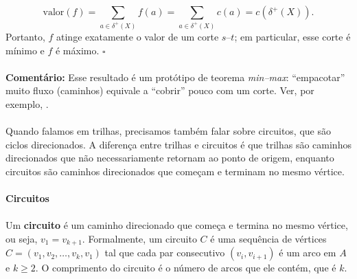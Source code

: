 \documentclass[12pt,a4paper]{article}
\begin{document}
\begin{center}
{{    \[\text{valor}(f)=\sum_{a\in\delta^+(X)} f(a)=\sum_{a\in\delta^+(X)} c(a)=c(\delta^+(X)).\]
    Portanto, \(f\) atinge exatamente o valor de um corte \(s\text{--}t\); em particular, esse corte é mínimo e \(f\) é máximo. \hfill$\square$

\paragraph{}
\smallskip
\textbf{Comentário:} Esse resultado é um protótipo de teorema \emph{min--max}: “empacotar” muito fluxo (caminhos) equivale a “cobrir” pouco com um corte. Ver, por exemplo, \cite{schrijver2003comb}.
}}
\endgroup
\end{center}

\paragraph{}
Quando falamos em trilhas, precisamos também falar sobre circuitos, que são ciclos direcionados.
A diferença entre trilhas e circuitos é que trilhas são caminhos direcionados que não necessariamente retornam ao ponto de origem, enquanto circuitos são caminhos direcionados que começam e terminam no mesmo vértice.

\paragraph{Circuitos}
\paragraph{}
 Um \textbf{circuito} é um caminho direcionado que começa e termina no mesmo vértice, ou seja, \(v_1 = v_{k+1}\). Formalmente, um circuito \(C\) é uma sequência de vértices \(C = (v_1, v_2, \ldots, v_k, v_1)\) tal que cada par consecutivo \((v_i, v_{i+1})\) é um arco em \(A\) e \(k \geq 2\). O comprimento do circuito é o número de arcos que ele contém, que é \(k\).
\end{document}
